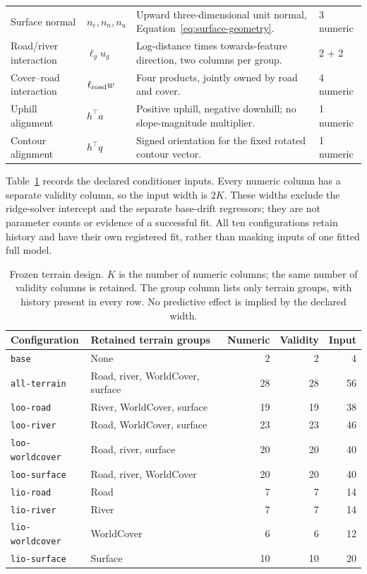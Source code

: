 \documentclass[11pt]{article}
\begin{document}
{\begin{longtable}{p{.16\linewidth}p{.16\linewidth}p{.44\linewidth}p{.12\linewidth}}
Surface normal & \(n_e,n_n,n_u\) & Upward three-dimensional unit normal, Equation~\eqref{eq:surface-geometry}. & 3 numeric\\
Road/river interaction & \(\ell_g u_g\) & Log-distance times towards-feature direction, two columns per group. & 2 + 2\\
Cover--road interaction & \(\ell_{\rm road}w\) & Four products, jointly owned by road and cover. & 4 numeric\\
Uphill alignment & \(h^\top a\) & Positive uphill, negative downhill; no slope-magnitude multiplier. & 1 numeric\\
Contour alignment & \(h^\top q\) & Signed orientation for the fixed rotated contour vector. & 1 numeric\\
\bottomrule
\end{longtable}
}

Table~\ref{tab:terrain-design} records the declared conditioner inputs.
Every numeric column has a separate validity column, so the input width is
\(2K\). These widths exclude the ridge-solver intercept and the separate
base-drift regressors; they are not parameter counts or evidence of a
successful fit. All ten configurations retain history and have their own
registered fit, rather than masking inputs of one fitted full model.

\begin{table}[htbp]
\centering\small
\caption{Frozen terrain design. \(K\) is the number of numeric columns;
the same number of validity columns is retained. The group column lists only
terrain groups, with history present in every row. No predictive effect is
implied by the declared width.}
\label{tab:terrain-design}
\begin{tabular}{p{.24\linewidth}p{.35\linewidth}rrr}
\toprule
Configuration & Retained terrain groups & Numeric & Validity & Input\\
\midrule
\texttt{base} & None & 2 & 2 & 4\\
\texttt{all-terrain} & Road, river, WorldCover, surface & 28 & 28 & 56\\
\texttt{loo-road} & River, WorldCover, surface & 19 & 19 & 38\\
\texttt{loo-river} & Road, WorldCover, surface & 23 & 23 & 46\\
\texttt{loo-worldcover} & Road, river, surface & 20 & 20 & 40\\
\texttt{loo-surface} & Road, river, WorldCover & 20 & 20 & 40\\
\texttt{lio-road} & Road & 7 & 7 & 14\\
\texttt{lio-river} & River & 7 & 7 & 14\\
\texttt{lio-worldcover} & WorldCover & 6 & 6 & 12\\
\texttt{lio-surface} & Surface & 10 & 10 & 20\\
\bottomrule
\end{tabular}
\end{table}
\end{document}
